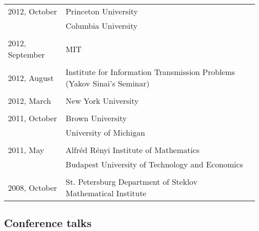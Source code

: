 \documentclass[letterpaper,11pt]{article}
\begin{document}
\begin{longtable}{llc}
	2012, October & Princeton University \\
	& Columbia University\\\\

	2012, September & MIT \\\\

	2012, August
	& Institute for Information Transmission Problems
	(Yakov Sinai's Seminar)
	\\\\

	2012, March & New York University\\\\

	2011, October & Brown University \\
	&University of Michigan
	\\
	\\
	2011, May& Alfr\'ed R\'enyi Institute of Mathematics
	\\
	& Budapest University of Technology and Economics
	\\\\

	2008, October &
	St. Petersburg Department of Steklov Mathematical
	Institute%
	\\
\end{longtable}
\bigskip



\subsection*{Conference talks}
\end{document}
